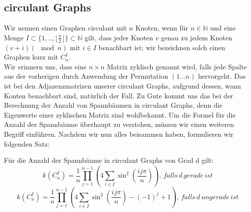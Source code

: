 \subsection{circulant Graphs}
Wir nennen einen Graphen circulant mit $n$ Knoten, wenn für $n \in \mathbb{N}$ und eine Menge $I \subset{\{1,..,\lfloor \frac{n}{2} \rfloor \}}\subset{\mathbb{N}}$ gilt, dass jeder Knoten $v$ genau zu jedem Knoten $(v+i) (\mod{n})$ mit $i \in I$ benachbart ist; wir bezeichnen solch einen Graphen kurz mit $C_n^I$.\\
Wir erinnern uns, dass eine $n\times n$ Matrix zyklisch genannt wird, falls jede Spalte aus der vorherigen durch Anwendung der Permutation $(1...n)$ hervorgeht.
Das ist bei den Adjazenzmatrizen unserer circulant Graphs, aufgrund dessen, wann Konten benachbart sind, natürlich der Fall.
Zu Gute kommt uns das bei der Berechnung der Anzahl von Spannbäumen in circulant Graphs, denn die Eigenwerte einer zyklischen Matrix sind wohlbekannt.%
Um die Formel für die Anzahl der Spannbäume überhaupt zu verstehen, müssen wir einen weiteren Begriff einführen.%
Nachdem wir nun alles beisammen haben, formulieren wir folgenden Satz:

\begin{Tms}
Für die Anzahl der Spannbäume in circulant Graphs von Grad d gilt:\\
\begin{equation}
\mathit{k}\left( C_n^I \right) = \frac{1}{n} \prod_{j=1}^{n-1} \left(4 \sum_{i \in I} \sin^2 \left( \frac{ij\pi}{n}\right) \right),\,falls\,d\,gerade\,ist
\end{equation}
\begin{equation}
\mathit{k}\left( C_n^I \right) = \frac{1}{n} \prod_{j=1}^{n-1} \left(4 \sum_{i \in I} \sin^2 \left( \frac{ij\pi}{n}\right)-(-1)^j+1\right),\,falls\,d\,ungerade\,ist
\end{equation}
\end{Tms}

\begin{Bsps}
\end{Bsps} 
